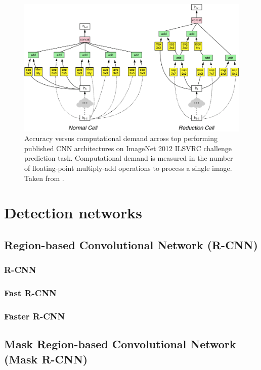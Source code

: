 \begin{figure}
    \includegraphics[width=\textwidth]{img/nasnet}
    \caption{Accuracy versus computational demand across top performing published CNN architectures on ImageNet 2012 ILSVRC challenge prediction task. Computational demand is measured in the number of floating-point multiply-add operations to process a single image. Taken from \cite{bib:nasnet}.}
    \label{fig:cnncomp}
\end{figure}


\section{Detection networks}
\label{chapt:models}


\subsection*{Region-based Convolutional Network (R-CNN)}
\subsubsection{R-CNN}
\subsubsection{Fast R-CNN}
\subsubsection{Faster R-CNN}

\subsection*{Mask Region-based Convolutional Network (Mask R-CNN)}

